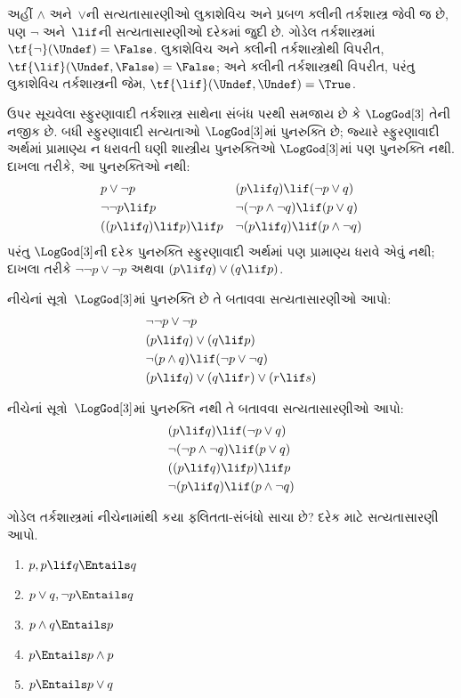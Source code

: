 અહીં $\land$ અને~$\lor$ની સત્યતાસારણીઓ લુકાશેવિચ અને પ્રબળ
ક્લીની તર્કશાસ્ત્ર જેવી જ છે, પણ $\lnot$ અને~$\lif$ની
સત્યતાસારણીઓ દરેકમાં જુદી છે. ગોડેલ તર્કશાસ્ત્રમાં
$\tf{\lnot}(\Undef) = \False$. લુકાશેવિચ અને ક્લીની
તર્કશાસ્ત્રોથી વિપરીત, $\tf{\lif}(\Undef, \False) = \False$;
અને ક્લીની તર્કશાસ્ત્રથી વિપરીત, પરંતુ લુકાશેવિચ તર્કશાસ્ત્રની જેમ,
$\tf{\lif}(\Undef, \Undef) = \True$.

ઉપર સૂચવેલા સ્ફુરણાવાદી તર્કશાસ્ત્ર સાથેના સંબંધ પરથી સમજાય છે કે
$\LogGod[3]$ તેની નજીક છે. બધી સ્ફુરણાવાદી સત્યતાઓ
$\LogGod[3]$માં પુનરુક્તિ છે; જ્યારે સ્ફુરણાવાદી અર્થમાં પ્રામાણ્ય
ન ધરાવતી ઘણી શાસ્ત્રીય પુનરુક્તિઓ $\LogGod[3]$માં પણ પુનરુક્તિ નથી.
દાખલા તરીકે, આ પુનરુક્તિઓ નથી:
\begin{align*}
  & p \lor \lnot p && (p \lif q) \lif (\lnot p \lor q) \\
  & \lnot\lnot p \lif p && \lnot(\lnot p \land \lnot q) \lif (p \lor q) \\
  & ((p \lif q) \lif p) \lif p && \lnot(p \lif q) \lif (p \land \lnot q)
\end{align*}
પરંતુ $\LogGod[3]$ની દરેક પુનરુક્તિ સ્ફુરણાવાદી અર્થમાં પણ
પ્રામાણ્ય ધરાવે એવું નથી; દાખલા તરીકે $\lnot\lnot p \lor \lnot p$
અથવા $(p \lif q) \lor (q \lif p)$.

\begin{prob}
  નીચેનાં સૂત્રો~$\LogGod[3]$માં પુનરુક્તિ છે તે બતાવવા
  સત્યતાસારણીઓ આપો:
  \begin{align*}
    & \lnot\lnot p \lor \lnot p\\
    & (p \lif q) \lor (q \lif p) \\
    & \lnot(p \land q) \lif (\lnot p \lor \lnot q) \\
    & (p \lif q) \lor (q \lif r) \lor (r \lif s)
  \end{align*}
\end{prob}

\begin{prob}
  નીચેનાં સૂત્રો~$\LogGod[3]$માં પુનરુક્તિ નથી તે બતાવવા
  સત્યતાસારણીઓ આપો:
  \begin{align*}
    & (p \lif q) \lif (\lnot p \lor q) \\
    & \lnot(\lnot p \land \lnot q) \lif (p \lor q) \\
    & ((p \lif q) \lif p) \lif p \\
    & \lnot(p \lif q) \lif (p \land \lnot q)
  \end{align*}
\end{prob}

\begin{prob}
  ગોડેલ તર્કશાસ્ત્રમાં નીચેનામાંથી કયા ફલિતતા-સંબંધો સાચા છે?
  દરેક માટે સત્યતાસારણી આપો.
  \begin{enumerate}
    \item $p, p \lif q \Entails q$
    \item $p \lor q, \lnot p \Entails q$
    \item $p \land q \Entails p$
    \item $p \Entails p \land p$
    \item $p \Entails p \lor q$
  \end{enumerate}
\end{prob}
\endgroup


